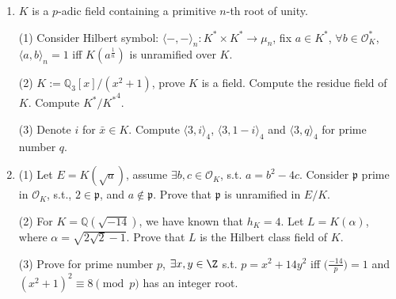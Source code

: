 \begin{enumerate}
(3) Prove that $|\operatorname{Cl}(\mathbb Q(\zeta_n))|$ divides $|\operatorname{Cl}(\mathbb Q(\zeta_n+\zeta_n^{-1}))|$.


\item $K$ is a $p$-adic field containing a primitive $n$-th root of unity. 

(1) Consider Hilbert symbol: $\langle-,-\rangle_n: K^* \times K^* \longrightarrow \mu_n$, fix $a\in K^*$, 
$\forall b\in \mathcal{O}_K^*$, $\langle a,b\rangle_n=1$ iff $K(a^{\frac{1}n})$ is unramified over $K$. 

(2) $K:=\mathbb Q_3[x]/(x^2+1)$, prove $K$ is a field. Compute the residue field of $K$. Compute $K^*/{K^*}^4$. 

(3) Denote $i$ for $\bar{x} \in K$. Compute $\langle 3,i\rangle_4$, $\langle 3,1-i\rangle_4$ and $\langle 3,q\rangle_4$ for prime number $q$. 

\item 

(1) Let $E=K(\sqrt a)$, assume $\exists b,c \in \mathcal{O}_K$, s.t. $a=b^2-4c$. 
Consider $\mathfrak p$ prime in $\mathcal{O}_K$, s.t., $2 \in \mathfrak p$, 
and $a\notin \mathfrak p$. Prove that $\mathfrak p$ is unramified in $E/K$. 

(2) For $K=\mathbb Q (\sqrt{-14})$, we have known that $h_K=4$. 
Let $L=K(\alpha)$, where $\alpha=\sqrt{2\sqrt2 -1}$. 
Prove that $L$ is the Hilbert class field of $K$. 

(3) Prove for prime number $p$, $\exists x,y\in \Z$ s.t. $p=x^2+14y^2$ 
iff $\big(\frac{-14}{p}\big)=1$ and $(x^2+1)^2\equiv 8 \pmod p$ has an integer root. 

\end{enumerate}
